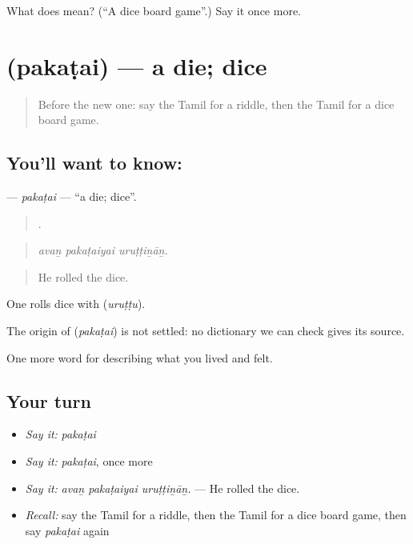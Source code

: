 \begin{tcolorbox}[breakable,colback=teal!4,colframe=teal!35!black,title={Before you move on}]
What does  mean? (\textquotedblleft{}A dice board game\textquotedblright{}.) Say it once more.
\end{tcolorbox}
\section[\texorpdfstring{\ta{பகடை} (pakaṭai)}{பகடை (pakaṭai)}]{ (pakaṭai) — a die; dice}

\label{lesson:TA-C529-pakatai}



\begin{quote}
Before the new one: say the Tamil for a riddle, then the Tamil for a dice board game.
\end{quote}

\subsection*{You'll want to know: }
\textbf{} — \emph{pakaṭai} — \textquotedblleft{}a die; dice\textquotedblright{}.

\begin{quote}
  .
\end{quote}

\begin{quote}
\emph{avaṉ pakaṭaiyai uruṭṭiṉāṉ.}
\end{quote}

\begin{quote}
He rolled the dice.
\end{quote}

One rolls dice with  (\emph{uruṭṭu}).

\begin{cousinweb}
The origin of \textbf{} (\emph{pakaṭai}) is not settled: no dictionary we can check gives its source.
\end{cousinweb}

\begin{grammarlens}[title={What you've built}]
One more word for describing what you lived and felt.
\end{grammarlens}

\subsection*{Your turn}
\begin{itemize}
\raggedright
  \item \emph{Say it:} \emph{pakaṭai}
  \item \emph{Say it:} \emph{pakaṭai}, once more
  \item \emph{Say it:} \emph{avaṉ pakaṭaiyai uruṭṭiṉāṉ.} — He rolled the dice.
  \item \emph{Recall:} say the Tamil for a riddle, then the Tamil for a dice board game, then say \emph{pakaṭai} again
\end{itemize}


